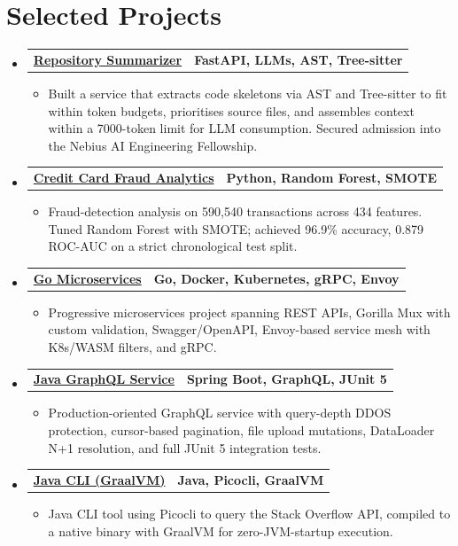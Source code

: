 \documentclass[letterpaper,11pt]{article}
\makeatletter
\newcommand{\resumeItem}[1]{
  \item\small{
    {#1 \vspace{-3pt}}
  }
}
\newcommand{\resumeProjectHeading}[2]{
  \vspace{-3pt}\item
    \begin{tabular*}{1.0\textwidth}[t]{l@{\extracolsep{\fill}}r}
      \textbf{#1} & \textbf{\small #2} \\
    \end{tabular*}\vspace{-7pt}
}
\newcommand{\resumeSubHeadingListStart}{\begin{itemize}[leftmargin=0.0in, label={}]}
\newcommand{\resumeSubHeadingListEnd}{\end{itemize}}
\newcommand{\resumeItemListStart}{\begin{itemize}}
\newcommand{\resumeItemListEnd}{\end{itemize}\vspace{0pt}}
\makeatother
\begin{document}
\section{Selected Projects}
\resumeSubHeadingListStart
    \resumeProjectHeading
        {\href{https://github.com/aymanapatel/nebius-project}{\textbf{Repository Summarizer}}}{FastAPI, LLMs, AST, Tree-sitter}
        \resumeItemListStart
            \resumeItem{Built a service that extracts code skeletons via AST and Tree-sitter to fit within token budgets, prioritises source files, and assembles context within a 7000-token limit for LLM consumption. Secured admission into the Nebius AI Engineering Fellowship.}
        \resumeItemListEnd
    \resumeProjectHeading
        {\href{https://github.com/aymanapatel/qmul-all-projects/blob/main/data-analytics/coursework1/credit-card-report.pdf}{\textbf{Credit Card Fraud Analytics}}}{Python, Random Forest, SMOTE}
        \resumeItemListStart
            \resumeItem{Fraud-detection analysis on 590,540 transactions across 434 features. Tuned Random Forest with SMOTE; achieved 96.9\% accuracy, 0.879 ROC-AUC on a strict chronological test split.}
        \resumeItemListEnd
    \resumeProjectHeading
        {\href{https://github.com/aymanapatel/golang-microservices}{\textbf{Go Microservices}}}{Go, Docker, Kubernetes, gRPC, Envoy}
        \resumeItemListStart
            \resumeItem{Progressive microservices project spanning REST APIs, Gorilla Mux with custom validation, Swagger/OpenAPI, Envoy-based service mesh with K8s/WASM filters, and gRPC.}
        \resumeItemListEnd
    \resumeProjectHeading
        {\href{https://github.com/aymanapatel/graphql-app}{\textbf{Java GraphQL Service}}}{Spring Boot, GraphQL, JUnit 5}
        \resumeItemListStart
            \resumeItem{Production-oriented GraphQL service with query-depth DDOS protection, cursor-based pagination, file upload mutations, DataLoader N+1 resolution, and full JUnit 5 integration tests.}
        \resumeItemListEnd
    \resumeProjectHeading
        {\href{https://github.com/aymanapatel/java-cli}{\textbf{Java CLI (GraalVM)}}}{Java, Picocli, GraalVM}
        \resumeItemListStart
            \resumeItem{Java CLI tool using Picocli to query the Stack Overflow API, compiled to a native binary with GraalVM for zero-JVM-startup execution.}
        \resumeItemListEnd
\resumeSubHeadingListEnd

\end{document}
